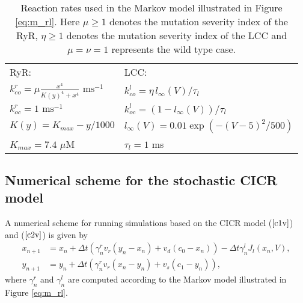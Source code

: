 \begin{table}
\begin{center}
\begin{tabular}[c]{|l|l|} \hline
RyR: & LCC: \\
$k_{co}^{r}=\mu \frac{x^4}{K(y)^4+x^4} \text{ ms}^{-1}$ &$k_{co}^{l}=\eta\, l_{\infty}(V)/\tau_l$ \\
$k_{oc}^{r}=1 \text{ ms}^{-1}$ & $k_{oc}^{l}=(1-l_{\infty}(V))/\tau_l$ \\
$K(y) =  K_{max}-y/1000$ &  $l_{\infty}(V) = 0.01 \exp(-(V-5)^{2}/500)$ \\
$K_{max} = 7.4$ $\mu$M & $\tau_l=1$ ms\\ \hline
\end{tabular}
\end{center}
\caption{Reaction rates used in the Markov model illustrated in
Figure \ref{eq:m_rl}.
 Here $\mu \ge 1$ denotes the mutation severity
index of the RyR, $\eta \ge 1$ denotes the mutation severity
index of the LCC and $\mu=\nu=1$ represents the wild type case.
\label{functions}
\label{tab:rate}}
\end{table}

\subsection{Numerical scheme for the stochastic CICR  model}

 A numerical scheme for running simulations based on the CICR model
($\ref{c1v}$) and ($\ref{c2v}$)
is given by
\begin{align}
x_{n+1} &  =x_{n}+\Delta t\left(  \gamma_{n}^{r}v_{r}\left(  y_{n}
-x_{n}\right)  +v_{d}\left(  c_{0}-x_{n}\right)  \right)  -\Delta t \gamma_{n}^{l}
J_{l}(x_{n},V),\label{nc1v}\\
y_{n+1} &  =y_{n}+\Delta t\left(  \gamma_{n}^{r}v_{r}\left(  x_{n}
-y_{n}\right)  +v_{s}\left(  c_{1}-y_{n}\right)  \right)  ,\label{nc2v}
\end{align}
where $\gamma_{n}^{r}$ and $\gamma_{n}^{l}$ are computed according to the
Markov model illustrated in Figure \ref{eq:m_rl}.

